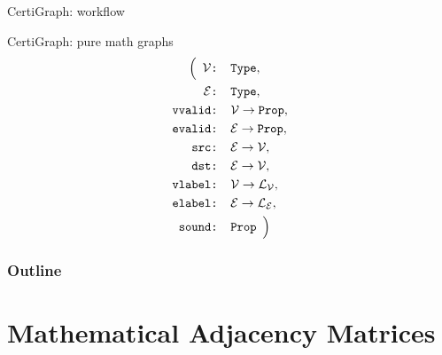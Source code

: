 \documentclass[usenames, xcolor=dvipsnames]{beamer}
\begin{document}
\begin{frame}{CertiGraph: workflow}
  
\end{frame}

\begin{frame}{CertiGraph: pure math graphs}
  \begin{align*}
\Big(\hspace{0.5em}\mathcal{V}& \texttt{: Type}, \\
\mathcal{E}& \texttt{: Type}, \\
\texttt{vvalid}& \texttt{: }\mathcal{V} \rightarrow \texttt{Prop}, \\ 
\texttt{evalid}& \texttt{: }\mathcal{E} \rightarrow \texttt{Prop}, \\
\texttt{src}& \texttt{: }\mathcal{E} \rightarrow \mathcal{V}, \\
\texttt{dst}& \texttt{: }\mathcal{E} \rightarrow \mathcal{V}, \\
\texttt{vlabel}& \texttt{: }\mathcal{V} \rightarrow \mathcal{L_V}, \\
\texttt{elabel}& \texttt{: }\mathcal{E} \rightarrow \mathcal{L_E}, \\
\texttt{sound}&\texttt{: Prop} \hspace{0.5em} \Big) 
\end{align*}

\end{frame}

\begin{frame}
\frametitle{Outline}
\tableofcontents
\end{frame}

\section{Mathematical Adjacency Matrices}
\end{document}
